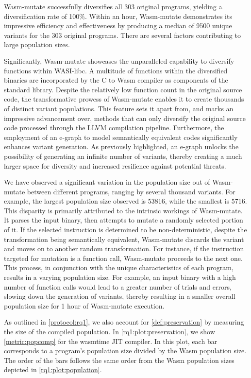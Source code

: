 \documentclass[sigplan,screen]{acmart}
\newcommand{\tool}{Wasm-mutate\xspace}
\newcommand{\wasm}{Wasm\xspace}
\begin{document}
\tool successfully diversifies all 303 original programs, yielding a diversification rate of 100\%. 
Within an hour, \tool demonstrates its impressive efficiency and effectiveness by producing a median of 9500 unique variants for the 303 original programs.
There are several factors contributing to large population sizes. 

Significantly, \tool showcases the unparalleled capability to diversify functions within WASI-libc. 
A multitude of functions within the diversified binaries are incorporated by the C to \wasm compiler as components of the standard library. 
Despite the relatively low function count in the original source code, the transformative prowess of \tool enables it to create thousands of distinct variant populations. 
This feature sets it apart from, and marks an impressive advancement over, methods that can only diversify the original source code processed through the LLVM compilation pipeline. 
Furthermore, the employment of an e-graph to model semantically equivalent codes significantly enhances variant generation. 
As previously highlighted, an e-graph unlocks the possibility of generating an infinite number of variants, thereby creating a much larger space for diversity and increased resilience against potential threats.


We have observed a significant variation in the population size out of \tool between different programs, ranging by several thousand variants. 
For example, the largest population size observed is 53816, while the smallest is 5716.
This disparity is primarily attributed to the intrinsic workings of \tool. 
It parses the input binary, then attempts to mutate a randomly selected portion of it. 
If the selected instruction is determined to be non-deterministic, despite the transformation being semantically equivalent, \tool discards the variant and moves on to another random transformation.
For instance, if the instruction targeted for mutation is a function call, \tool proceeds to the next one.
This process, in conjunction with the unique characteristics of each program, results in a varying population size. 
For example, an input binary with a high number of function calls would lead to a greater number of trials and errors, slowing down the generation of variants, thereby resulting in a smaller overall population size for 1 hour of \tool execution.

As outlined in \autoref{protocol:rq1}, we also account for \autoref{def:preservation} by measuring the size of the compiled population. 
In \autoref{rq1:plot:preservation}, we show \autoref{metric:popcomp} for the wasmtime JIT compiler.
In this plot, each bar corresponds to a program's population size divided by the \wasm population size.
The order of the bars follows the same order from the \wasm population sizes depicted in \autoref{rq1:plot:population}.
\end{document}
